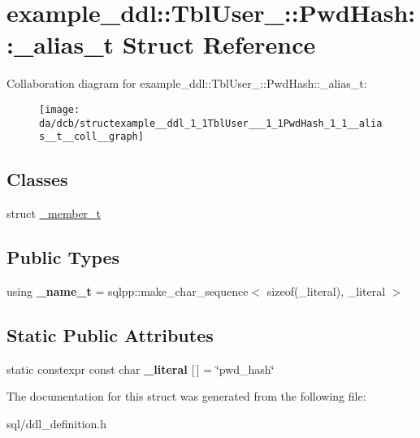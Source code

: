 \hypertarget{structexample__ddl_1_1TblUser___1_1PwdHash_1_1__alias__t}{}\section{example\+\_\+ddl\+:\+:Tbl\+User\+\_\+\+:\+:Pwd\+Hash\+:\+:\+\_\+alias\+\_\+t Struct Reference}
\label{structexample__ddl_1_1TblUser___1_1PwdHash_1_1__alias__t}


Collaboration diagram for example\+\_\+ddl\+:\+:Tbl\+User\+\_\+\+:\+:Pwd\+Hash\+:\+:\+\_\+alias\+\_\+t\+:
\nopagebreak
\begin{figure}[H]
\begin{center}
\leavevmode
\texttt{[image: da/dcb/structexample\_\_ddl\_1\_1TblUser\_\_\_1\_1PwdHash\_1\_1\_\_alias\_\_t\_\_coll\_\_graph]}
\end{center}
\end{figure}
\subsection*{Classes}
\begin{DoxyCompactItemize}
\item 
struct \hyperlink{structexample__ddl_1_1TblUser___1_1PwdHash_1_1__alias__t_1_1__member__t}{\+\_\+member\+\_\+t}
\end{DoxyCompactItemize}
\subsection*{Public Types}
\begin{DoxyCompactItemize}
\item 
\hypertarget{structexample__ddl_1_1TblUser___1_1PwdHash_1_1__alias__t_ab6fe6b76fd639d021f6c782b338d3f18}{}using {\bfseries \+\_\+name\+\_\+t} = sqlpp\+::make\+\_\+char\+\_\+sequence$<$ sizeof(\+\_\+literal), \+\_\+literal $>$\label{structexample__ddl_1_1TblUser___1_1PwdHash_1_1__alias__t_ab6fe6b76fd639d021f6c782b338d3f18}

\end{DoxyCompactItemize}
\subsection*{Static Public Attributes}
\begin{DoxyCompactItemize}
\item 
\hypertarget{structexample__ddl_1_1TblUser___1_1PwdHash_1_1__alias__t_a1c555d93fede775734e10f1641cc547d}{}static constexpr const char {\bfseries \+\_\+literal} \mbox{[}$\,$\mbox{]} = \char`\"{}pwd\+\_\+hash\char`\"{}\label{structexample__ddl_1_1TblUser___1_1PwdHash_1_1__alias__t_a1c555d93fede775734e10f1641cc547d}

\end{DoxyCompactItemize}


The documentation for this struct was generated from the following file\+:\begin{DoxyCompactItemize}
\item 
sql/ddl\+\_\+definition.\+h\end{DoxyCompactItemize}
